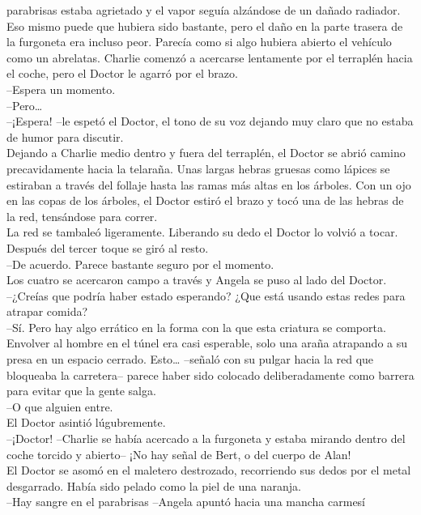 parabrisas estaba agrietado y el vapor seguía alzándose de un dañado
radiador.\\
Eso mismo puede que hubiera sido bastante, pero el daño en la parte
trasera de la furgoneta era incluso peor. Parecía como si algo hubiera
abierto el vehículo como un abrelatas. Charlie comenzó a acercarse
lentamente por el terraplén hacia el coche, pero el Doctor le agarró por
el brazo.\\
--Espera un momento.\\
--Pero\ldots{}\\
--¡Espera! --le espetó el Doctor, el tono de su voz dejando muy claro
que no estaba de humor para discutir.\\
Dejando a Charlie medio dentro y fuera del terraplén, el Doctor se abrió
camino precavidamente hacia la telaraña. Unas largas hebras gruesas como
lápices se estiraban a través del follaje hasta las ramas más altas en
los árboles. Con un ojo en las copas de los árboles, el Doctor estiró el
brazo y tocó una de las hebras de la red, tensándose para correr.\\
La red se tambaleó ligeramente. Liberando su dedo el Doctor lo volvió a
tocar. Después del tercer toque se giró al resto.\\
--De acuerdo. Parece bastante seguro por el momento.\\
Los cuatro se acercaron campo a través y Angela se puso al lado del
Doctor.\\
--¿Creías que podría haber estado esperando? ¿Que está usando estas
redes para atrapar comida?\\
--Sí. Pero hay algo errático en la forma con la que esta criatura se
comporta. Envolver al hombre en el túnel era casi esperable, solo una
araña atrapando a su presa en un espacio cerrado. Esto\ldots{} --señaló
con su pulgar hacia la red que bloqueaba la carretera-- parece haber
sido colocado deliberadamente como barrera para evitar que la gente
salga.\\
--O que alguien entre.\\
El Doctor asintió lúgubremente.\\
--¡Doctor! --Charlie se había acercado a la furgoneta y estaba mirando
dentro del coche torcido y abierto-- ¡No hay señal de Bert, o del cuerpo
de Alan!\\
El Doctor se asomó en el maletero destrozado, recorriendo sus dedos por
el metal desgarrado. Había sido pelado como la piel de una naranja.\\
--Hay sangre en el parabrisas --Angela apuntó hacia una mancha carmesí
